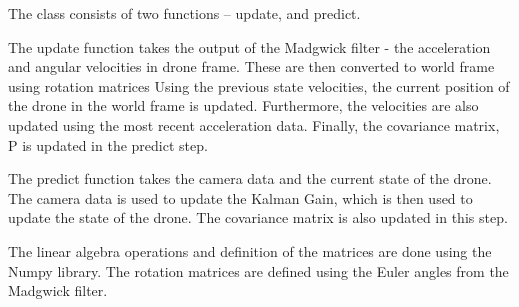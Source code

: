 \documentclass[bare_jrnl_transmag]{subfiles}
\begin{document}
The class consists of two functions -- update, and predict. 

The update function takes the output of the Madgwick filter - the acceleration and angular velocities in drone frame. These are then converted to world frame using rotation matrices Using the previous state velocities, the current position of the drone in the world frame is updated. Furthermore, the velocities are also updated using the most recent acceleration data. Finally, the covariance matrix, P is updated in the predict step.

The predict function takes the camera data and the current state of the drone. The camera data is used to update the Kalman Gain, which is then used to update the state of the drone. The covariance matrix is also updated in this step.

The linear algebra operations and definition of the matrices are done using the Numpy library. The rotation matrices are defined using the Euler angles from the Madgwick filter. 
\end{document}
